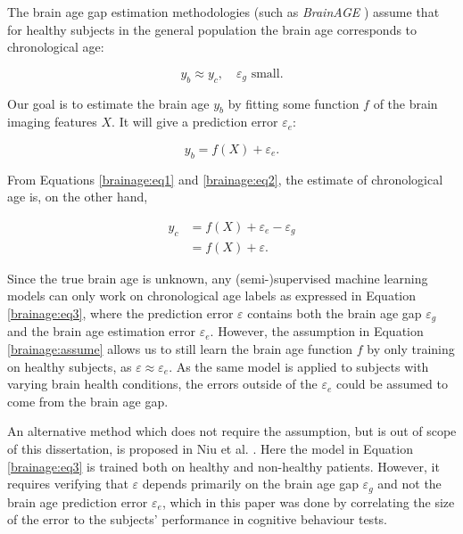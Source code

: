 The brain age gap estimation methodologies (such as \textit{BrainAGE} \cite{franke2019ten}) assume that for healthy subjects in the general population the brain age corresponds to chronological age:

\begin{equation}
    \label{brainage:assume}
    y_b \approx y_c,\quad \varepsilon_g \text{ small}.
\end{equation}

Our goal is to estimate the brain age $y_b$ by fitting some function $f$ of the brain imaging features $X$. It will give a prediction error $\varepsilon_e$:

\begin{equation}
    \label{brainage:eq2}
    y_b = f(X) + \varepsilon_e.
\end{equation}

From Equations \ref{brainage:eq1} and \ref{brainage:eq2}, the estimate of chronological age is, on the other hand,

\begin{align}
    y_c &= f(X) + \varepsilon_e - \varepsilon_g \\
        \label{brainage:eq3}
        &= f(X) + \varepsilon.
\end{align}

Since the true brain age is unknown, any (semi-)supervised machine learning models can only work on chronological age labels as expressed in Equation \ref{brainage:eq3}, where the prediction error $\varepsilon$ contains both the brain age gap $\varepsilon_g$ and the brain age estimation error $\varepsilon_e$. However, the assumption in Equation \ref{brainage:assume} allows us to still learn the brain age function $f$ by only training on healthy subjects, as $\varepsilon \approx \varepsilon_e$. As the same model is applied to subjects with varying brain health conditions, the errors outside of the $\varepsilon_e$ could be assumed to come from the brain age gap.  

An alternative method which does not require the assumption, but is out of scope of this dissertation, is proposed in Niu et al. \cite{niu2019improved}. Here the model in Equation \ref{brainage:eq3} is trained both on healthy and non-healthy patients. However, it requires verifying that $\varepsilon$ depends primarily on the brain age gap $\varepsilon_g$ and not the brain age prediction error $\varepsilon_e$, which in this paper was done by correlating the size of the error to the subjects' performance in cognitive behaviour tests.

